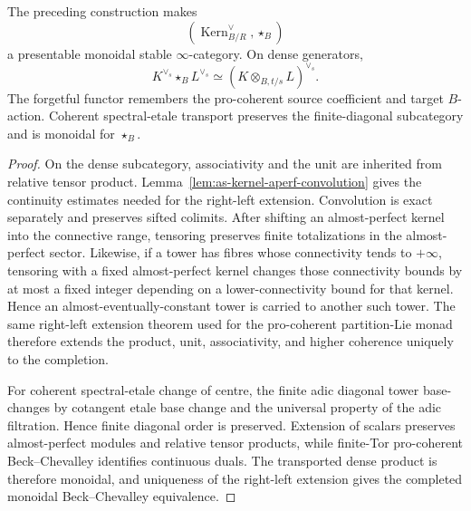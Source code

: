 \begin{proposition}
\label{prop:as-procoherent-kernel-convolution}
The preceding construction makes
\[
\boxed{
    \left(
        \operatorname{Kern}^{\vee}_{B/R},
        \star_B
    \right)
}
\]
a presentable monoidal stable $\infty$-category.  On dense generators,
\[
    K^{\vee_s}\star_BL^{\vee_s}
    \simeq
    (K\otimes_{B,t/s}L)^{\vee_s}.
\]
The forgetful functor remembers the pro-coherent source coefficient and target
$B$-action.  Coherent spectral-etale transport preserves the finite-diagonal
subcategory and is monoidal for $\star_B$.
\end{proposition}

\begin{proof}
On the dense subcategory, associativity and the unit are inherited from
relative tensor product.  Lemma~\ref{lem:as-kernel-aperf-convolution} gives
the continuity estimates needed for the right-left extension.  Convolution is
exact separately and preserves sifted colimits.  After shifting an
almost-perfect kernel into the connective range, tensoring preserves finite
totalizations in the almost-perfect sector.  Likewise, if a tower has fibres
whose connectivity tends to $+\infty$, tensoring with a fixed almost-perfect
kernel changes those connectivity bounds by at most a fixed integer depending
on a lower-connectivity bound for that kernel.  Hence an
almost-eventually-constant tower is carried to another such tower.  The same
right-left extension theorem used for the pro-coherent partition-Lie monad
therefore extends the product, unit, associativity, and higher coherence
uniquely to the completion.

For coherent spectral-etale change of centre, the finite adic diagonal tower
base-changes by cotangent etale base change and the universal property of the
adic filtration.  Hence finite diagonal order is preserved.  Extension of
scalars preserves almost-perfect modules and relative tensor products, while
finite-Tor pro-coherent Beck--Chevalley identifies continuous duals.  The
transported dense product is therefore monoidal, and uniqueness of the
right-left extension gives the completed monoidal Beck--Chevalley
equivalence.
\end{proof}


